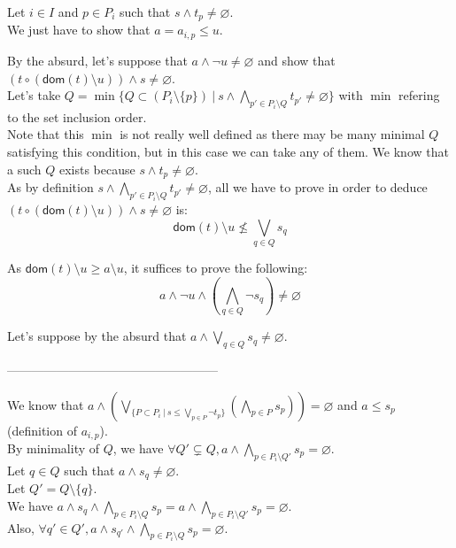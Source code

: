 \documentclass[a4paper]{article}%
\newcommand{\apply}[2]{#1\circ#2}
\newcommand{\dom}[1]{\textsf{dom}(#1)}
\newcommand{\alt}{~|~}
\begin{document}
    Let $i \in I$ and $p \in P_i$ such that $s \land t_p \neq \varnothing$.\\
    We just have to show that $a = a_{i,p} \leq u$.

    By the absurd, let's suppose that $a \land \neg u \neq \varnothing$ and show that $(\apply t {(\dom t \setminus u)}) \land s \neq \varnothing$.\\

    Let's take $Q = \min \{ Q \subset (P_i \setminus \{p\}) \alt s \land \bigwedge_{p' \in P_i\setminus Q} t_{p'} \neq \varnothing \}$ with $\min$ refering to the set inclusion order.\\
    Note that this $\min$ is not really well defined as there may be many minimal $Q$ satisfying this condition, but in this case we can take any of them.     We know that a such $Q$ exists because $s \land t_p \neq \varnothing$.\\

    As by definition $s \land \bigwedge_{p'\in P_i\setminus Q}t_{p'} \neq \varnothing$, all we have to prove in order to deduce $(\apply t {(\dom t \setminus u)}) \land s \neq \varnothing$ is:\\
    \[ \dom t \setminus u \not\leq \bigvee_{q\in Q}s_q \]

    As $ \dom t \setminus u \geq a \setminus u$, it suffices to prove the following:
    \[ a \land \neg u \land (\bigwedge_{q\in Q} \neg s_q) \neq \varnothing \]

    Let's suppose by the absurd that $a \land \bigvee_{q\in Q} s_q \neq \varnothing$.

    ---------------------------------------------------

    We know that $a \land \left(\bigvee_{\{P \subset P_i\alt s \leq \bigvee_{p \in P} \neg t_p\}} \left(\bigwedge_{p \in P} s_p\right) \right) = \varnothing$ and $a \leq s_p$ (definition of $a_{i,p}$).\\
    By minimality of $Q$, we have $\forall Q' \subsetneq Q, a \land \bigwedge_{p \in P_i\setminus Q'} s_p = \varnothing$.\\


    Let $q \in Q$ such that $a \land s_q \neq \varnothing$.\\
    Let $Q'=Q\setminus\{q\}$.\\
    We have $a \land s_q \land \bigwedge_{p \in P_i\setminus Q} s_p = a \land \bigwedge_{p \in P_i\setminus Q'} s_p = \varnothing$.\\
    Also, $\forall q'\in Q', a \land s_{q'} \land \bigwedge_{p \in P_i\setminus Q} s_p = \varnothing$.\\
\end{document}
